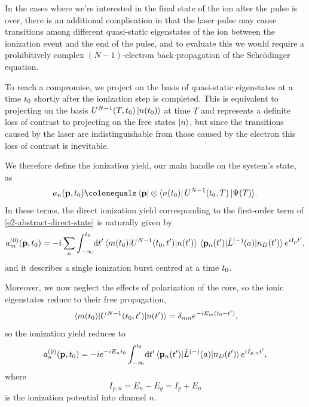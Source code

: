 In the cases where we're interested in the final state of the ion after the pulse is over, there is an additional complication in that the laser pulse may cause transitions among different quasi-static eigenstates of the ion between the ionization event and the end of the pulse, and to evaluate this we would require a prohibitively complex $(N-1)$-electron back-propagation of the Schrödinger equation.

To reach a compromise, we project on the basis of quasi-static eigenstates at a time ${t_0}$ shortly after the ionization step is completed. This is equivalent to projecting on the basis $U^{N-1}(T,{t_0})\ket{n({t_0})}$ at time $T$ and represents a definite loss of contrast to projecting on the free states $\ket{n}$, but since the transitions caused by the laser are indistinguishable from those caused by the electron this loss of contrast is inevitable.

We therefore define the ionization yield, our main handle on the system's state, as
\begin{equation}
a_n(\vb{p},\tn)\colonequals\bra{\vb{p}}\otimes\bra{n(\tn)}U^{N-1}(\tn,T)\ket{\Psi(T)}\!.
\label{e2-ionization-yield}
\end{equation}
In these terms, the direct ionization yield corresponding to the first-order term of \eqref{e2-abstract-direct-state} is naturally given by
\begin{align}
a_m^{(0)}(\vb{p},\tn)
=
-i\sum_n \int_{-\infty}^{\tn}\!\d t' \matrixel{m(\tn)}{U^{N-1}(\tn,t')}{n(t')} \matrixel{\vb{p}_n(t')}{\hat{L}^{(-)}(a)}{n_D(t')}e^{iI_p t'},
\label{e2-setup-a1}
\end{align}
and it describes a single ionization burst centred at a time ${t_0}$.

Moreover, we now neglect the effects of polarization of the core, so the ionic eigenstates reduce to their free propagation,
\begin{equation}
\matrixel{m(\tn)}{U^{N-1}(\tn,t')}{n(t')}=\delta_{mn}e^{-iE_m(\tn-t')},
\label{e2-propagated-quasistatic-eigenstates}
\end{equation}
so the ionization yield reduces to
\begin{align}
a_n^{(0)}(\vb{p},\tn)
=
-i e^{-iE_n\tn} \int_{-\infty}^{\tn}\!\d t' \matrixel{\vb{p}_n(t')}{\hat{L}^{(-)}(a)}{n_D(t')}e^{i I_{p,n} t'},
\label{e2-sae-yield-beginning}
\end{align}
where 
\begin{equation}
I_{p,n}=E_n-E_g=I_p+E_n
\end{equation}
is the ionization potential into channel $n$.









